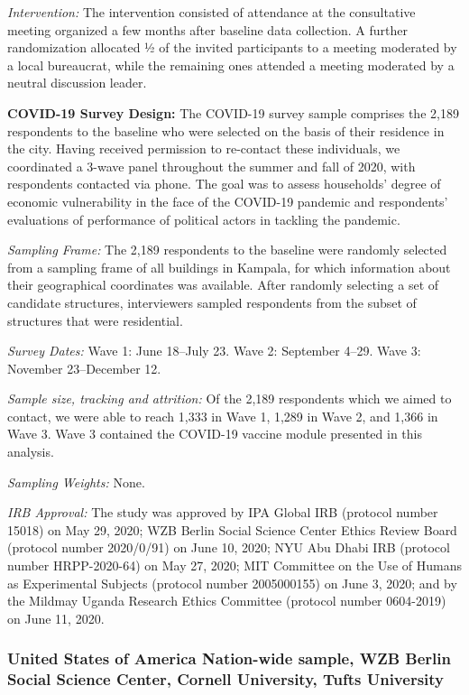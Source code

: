 \documentclass[
  12pt,
]{article}
\begin{document}
\emph{Intervention:} The intervention consisted of attendance at the consultative meeting organized a few months after baseline data collection. A further randomization allocated ½ of the invited participants to a meeting moderated by a local bureaucrat, while the remaining ones attended a meeting moderated by a neutral discussion leader.

\textbf{COVID-19 Survey Design:} The COVID-19 survey sample comprises the 2,189 respondents to the baseline who were selected on the basis of their residence in the city. Having received permission to re-contact these individuals, we coordinated a 3-wave panel throughout the summer and fall of 2020, with respondents contacted via phone. The goal was to assess households' degree of economic vulnerability in the face of the COVID-19 pandemic and respondents' evaluations of performance of political actors in tackling the pandemic.

\emph{Sampling Frame:} The 2,189 respondents to the baseline were randomly selected from a sampling frame of all buildings in Kampala, for which information about their geographical coordinates was available. After randomly selecting a set of candidate structures, interviewers sampled respondents from the subset of structures that were residential.

\emph{Survey Dates:} Wave 1: June 18--July 23. Wave 2: September 4--29. Wave 3: November 23--December 12.

\emph{Sample size, tracking and attrition:} Of the 2,189 respondents which we aimed to contact, we were able to reach 1,333 in Wave 1, 1,289 in Wave 2, and 1,366 in Wave 3. Wave 3 contained the COVID-19 vaccine module presented in this analysis.

\emph{Sampling Weights:} None.

\emph{IRB Approval:} The study was approved by IPA Global IRB (protocol number 15018) on May 29, 2020; WZB Berlin Social Science Center Ethics Review Board (protocol number 2020/0/91) on June 10, 2020; NYU Abu Dhabi IRB (protocol number HRPP-2020-64) on May 27, 2020; MIT Committee on the Use of Humans as Experimental Subjects (protocol number 2005000155) on June 3, 2020; and by the Mildmay Uganda Research Ethics Committee (protocol number 0604-2019) on June 11, 2020.

\hypertarget{united-states-of-america-nation-wide-sample-wzb-berlin-social-science-center-cornell-university-tufts-university}{%
\subsubsection*{United States of America Nation-wide sample, WZB Berlin Social Science Center, Cornell University, Tufts University}\label{united-states-of-america-nation-wide-sample-wzb-berlin-social-science-center-cornell-university-tufts-university}}
\end{document}
